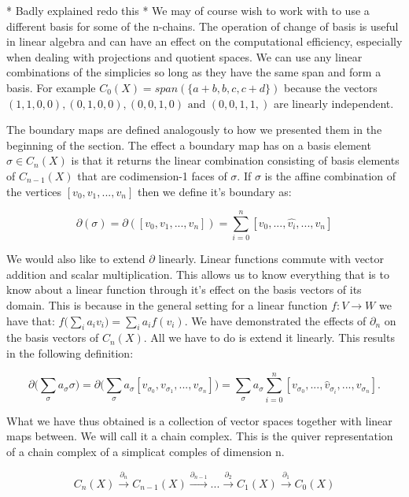 * Badly explained redo this *
We may of course wish to work with to use a different basis for some of the n-chains. The operation of change of basis is useful in linear algebra and can have an effect on the computational efficiency, especially when dealing with projections and quotient spaces. We can use any linear combinations of the simplicies so long as they have the same span and form a basis. For example $C_0(X) = span(\{a + b, b, c, c + d\})$ because the vectors $(1, 1, 0, 0), (0, 1, 0, 0), (0, 0, 1, 0) \text { and } (0, 0, 1, 1,)$ are linearly independent.

The boundary maps are defined analogously to how we presented them in the beginning of the section. The effect a boundary map has on a basis element $\sigma \in C_n(X)$ is that it returns the linear combination consisting of basis elements of $C_{n-1}(X)$ that are codimension-1 faces of $\sigma$. If $\sigma$ is the affine combination of the vertices $[v_0, v_1, ..., v_n]$ then we define it's boundary as:

$$ \partial(\sigma) = \partial([v_0, v_1, ..., v_n]) = \sum_{i=0}^{n}[v_0, ... , \hat{v_i}, ..., v_n] $$

We would also like to extend $\partial$ linearly. Linear functions commute with vector addition and scalar multiplication. This allows us to know everything that is to know about a linear function through it's effect on the basis vectors of its domain. This is because in the general setting for a linear function $f : V \to W$ we have that: $ f\big(\sum_{i}{a_iv_i}\big) = \sum_i{a_if(v_i)} $. We have demonstrated the effects of $\partial_n$ on the basis vectors of $C_n(X)$. All we have to do is extend it linearly. This results in the following definition:


$$ \partial\bigg(\sum_{\sigma}a_{\sigma}\sigma\bigg) = \partial\bigg(\sum_{\sigma}{a_{\sigma}[v_{\sigma_0}, v_{\sigma_1}, ..., v_{\sigma_n}]}\bigg) = \sum_{\sigma}{a_{\sigma} \sum_{i=0}^{n}[v_{\sigma_0},..., \hat{v}_{\sigma_i}, ..., v_{\sigma_n}]} .$$


What we have thus obtained is a collection of vector spaces together with linear maps between. We will call it a chain complex. This is the quiver representation of a chain complex of a simplicat comples of dimension n.


$$ C_n(X) \overset{\partial_n}{\longrightarrow} C_{n-1}(X) \overset{\partial_{n-1}}{\longrightarrow} ... \overset{\partial_2}{\longrightarrow} C_1(X) \overset{\partial_1}{\longrightarrow} C_0(X) $$

